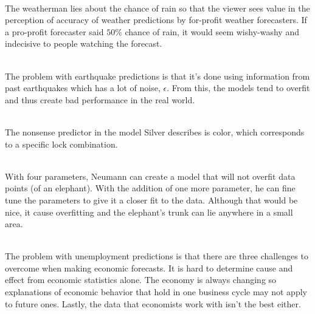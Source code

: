\documentclass[12pt]{article}
\begin{document}
\begin{enumerate}
 \\
The weatherman lies about the chance of rain so that the viewer sees value in the perception of accuracy of weather predictions by for-profit weather forecasters. If a pro-profit forecaster said $50\%$ chance of rain, it would seem wishy-washy and indecisive to people watching the forecast. 

 \\ 
The problem with earthquake predictions is that it's done using information from past earthquakes which has a lot of noise, $\epsilon$. From this, the models tend to overfit and thus create bad performance in the real world. 

 \\ The nonsense predictor in the model Silver describes is color, which corresponds to a specific lock combination. 

 \\ With four parameters, Neumann can create a model that will not overfit data points (of an elephant). With the addition of one more parameter, he can fine tune the parameters to give it a closer fit to the data. Although that would be nice, it cause overfitting and the elephant's trunk can lie anywhere in a small area. 

 \\ The problem with unemployment predictions is that there are three challenges to overcome when making economic forecasts. It is hard to determine cause and effect from economic statistics alone. The economy is always changing so explanations of economic behavior that hold in one business cycle may not apply to future ones. Lastly, the data that economists work with isn't the best either. 


\end{enumerate}
\end{document}
